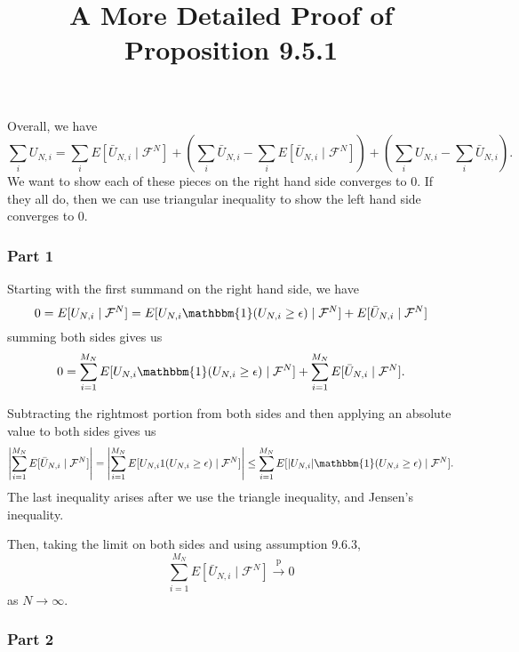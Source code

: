 \documentclass{article}
\title{A More Detailed Proof of Proposition 9.5.1}
\begin{document}
\maketitle

Overall, we have
$$
\sum_i U_{N,i} = \sum_i E[ \bar{U}_{N,i}  \mid \mathcal{F}^N]  + \left(\sum_i \bar{U}_{N,i} - \sum_i E[ \bar{U}_{N,i}  \mid \mathcal{F}^N] \right) +  \left(\sum_i U_{N,i} - \sum_i \bar{U}_{N,i}\right).
$$
We want to show each of these pieces on the right hand side converges to $0$. If they all do, then we can use triangular inequality to show the left hand side converges to $0$.


\subsubsection*{Part 1}

Starting with the first summand on the right hand side, we have
\[
0 = E[U_{N,i} \mid \mathcal{F}^N] = E[U_{N,i}\mathbbm{1}(U_{N,i} \ge \epsilon) \mid \mathcal{F}^N] + E[\bar{U}_{N,i}\mid \mathcal{F}^N ]
\]
summing both sides gives us
\[
0 = \sum_{i=1}^{M_N} E[U_{N,i} \mathbbm{1}(U_{N,i} \ge \epsilon) \mid \mathcal{F}^N] + \sum_{i=1}^{M_N} E[\bar{U}_{N,i}\mid \mathcal{F}^N ].
\]

Subtracting the rightmost portion from both sides and then applying an absolute value to both sides gives us
\[
\left|\sum_{i=1}^{M_N} E[\bar{U}_{N,i}\mid \mathcal{F}^N ] \right| = \left| \sum_{i=1}^{M_N} E[U_{N,i}1(U_{N,i} \ge \epsilon) \mid \mathcal{F}^N] \right| \le \sum_{i=1}^{M_N} E[|U_{N,i}| \mathbbm{1}(U_{N,i} \ge \epsilon) \mid \mathcal{F}^N] .
\]
The last inequality arises after we use the triangle inequality, and Jensen's inequality. 

Then, taking the limit on both sides and using assumption 9.6.3,
\[
\sum_{i=1}^{M_N} E[\bar{U}_{N,i}\mid \mathcal{F}^N ] \overset{\text{p}}{\to} 0 \tag{1} 
\]
as $N \to \infty$.

\subsubsection*{Part 2}
\end{document}
